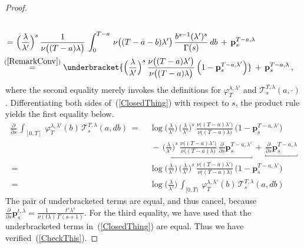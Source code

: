 \documentclass[10pt]{article}
\def\stackrel#1#2{\mathrel{\mathop{#2}\limits^{#1}}}
\numberwithin{equation}{section}
\theoremstyle{definition}
\begin{document}
\begin{proof}
\begin{align}
    \\ \,=\,&\,\Big(\frac{\lambda}{\lambda'}\Big)^s \,\frac{ 1  }{  \nu\big((T-a) \lambda\big)    }  \,\int_0^{T-a}\,   \nu\big((T-a-b) \lambda'\big) \,\frac{b^{s-1} (\lambda')^s  }{ \Gamma(s) }\,   db\,+\, \mathbf{p}^{T-a,\lambda}_{s} \nonumber
    \\ \,& \hspace{-.55cm}\stackrel{(\ref{RemarkConv}) }{=}   \underbracket{\Big(\frac{\lambda}{\lambda'}\Big)^s \,\frac{ \nu\big((T-a) \lambda' \big)    }{  \nu\big((T-a) \lambda  \big)    } \,\Big(1- \mathbf{p}^{T-a,\lambda'}_{s}\Big)}\,+\, \mathbf{p}^{T-a,\lambda}_{s}\,,
\end{align}
where the second equality merely invokes the definitions for $\varphi_T^{\lambda,\lambda'}$ and  $\mathscr{T}^{T,\lambda}_{s}(a,\cdot)$. 
 Differentiating both sides of~(\ref{ClosedThing}) with respect to $s$, the product rule  yields the first equality below.
\begin{align*}
    \frac{\partial}{\partial s}\,\int_{[0,T]}  \,  \varphi_T^{\lambda,\lambda'}(b)\,\mathscr{T}^{T,\lambda}_{s}(a,db)  \,=\,&\,\log\Big(\frac{\lambda}{\lambda'}\Big)\, \Big(\frac{\lambda}{\lambda'}\Big)^s \,\frac{ \nu\big((T-a)\lambda' \big)    }{  \nu\big((T-a) \lambda\big)    } \,\Big(1- \mathbf{p}^{T-a,\lambda'}_{s}\Big)\\  &\,\,-\,\underbracket{\Big(\frac{\lambda}{\lambda'}\Big)^s\,\frac{ \nu\big((T-a) \lambda'\big)  }{  \nu\big((T-a) \lambda\big)    }\,  \frac{\partial}{\partial s} \mathbf{p}^{T-a,\lambda'}_{s}}\,+\, \underbracket{\frac{\partial}{\partial s}\mathbf{p}^{T-a,\lambda}_{s}}
     \\   \,=\,&\, \log\Big(\frac{\lambda}{\lambda'}\Big)\,\Big(\frac{\lambda}{\lambda'}\Big)^s \,\frac{ \nu\big((T-a)\lambda' \big)    }{  \nu\big((T-a)\lambda \big)    } \,\Big(1- \mathbf{p}^{T-a,\lambda'}_{s}\Big)\\ \,=\,&\,\log\Big(\frac{\lambda}{\lambda'} \Big)\,\int_{[0,T)}\,  \varphi_T^{\lambda,\lambda'}(b)\,\mathscr{T}^{T,\lambda}_{s}(a,db) 
\end{align*}
The pair of underbracketed terms are equal, and thus cancel, because  $\frac{\partial}{\partial s}\mathbf{p}^{t,\lambda}_{s}=\frac{1}{  \nu( t \lambda)  }\frac{ t^s \lambda^s }{\Gamma(s+1) }$.  For  the third equality, we  have used that the underbracketed terms in~(\ref{ClosedThing})  are equal.  Thus we have verified~(\ref{CheckThis}).


\end{proof}
\end{document}
